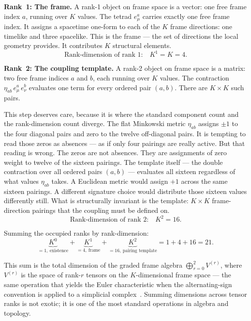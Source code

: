 \documentclass[a4paper,11pt]{article}
\begin{document}
\textbf{Rank~1: The frame.}
A rank-1 object on frame space is a vector: one free
frame index $a$, running over $K$ values. The tetrad
$e^a_\mu$ carries exactly one free frame index. It assigns
a spacetime one-form to each of the $K$ frame
directions: one timelike and three spacelike. This is
the frame --- the set of directions the local geometry
provides. It contributes $K$ structural elements.
\begin{equation*}
  \text{Rank-dimension of rank 1:}\quad K^1 = K = 4.
\end{equation*}

\textbf{Rank~2: The coupling template.}
A rank-2 object on frame space is a matrix: two free
frame indices $a$ and $b$, each running over $K$ values.
The contraction $\eta_{ab}\,e^a_\mu\,e^b_\nu$ evaluates
one term for every ordered pair $(a,b)$. There are
$K \times K$ such pairs.

This step deserves care, because it is where the standard
component count and the rank-dimension count diverge.
The flat Minkowski metric $\eta_{ab}$ assigns $\pm 1$
to the four diagonal pairs and zero to the twelve
off-diagonal pairs. It is tempting to read those zeros
as absences --- as if only four pairings are really
active. But that reading is wrong. The zeros are not
absences. They are assignments of zero weight to twelve
of the sixteen pairings. The template itself --- the
double contraction over all ordered pairs $(a,b)$ ---
evaluates all sixteen regardless of what values
$\eta_{ab}$ takes. A Euclidean metric would assign $+1$
across the same sixteen pairings. A different signature choice would distribute those sixteen
values differently still. What is structurally
invariant is the template: $K \times K$ frame-direction
pairings that the coupling must be defined on.
\begin{equation*}
  \text{Rank-dimension of rank 2:}\quad K^2 = 16.
\end{equation*}

Summing the occupied ranks by rank-dimension:
\begin{equation}
  \underbrace{K^0}_{= 1,\ \text{existence}}
  +\underbrace{K^1}_{= 4,\ \text{frame}}
  +\underbrace{K^2}_{= 16,\ \text{pairing template}}
  = 1 + 4 + 16 = 21.
  \label{eq:sum}
\end{equation}

This sum is the total dimension of the graded frame algebra
$\bigoplus_{r=0}^{2} V^{(r)}$, where $V^{(r)}$ is the
space of rank-$r$ tensors on the $K$-dimensional frame
space --- the same operation that yields the Euler
characteristic when the alternating-sign convention is
applied to a simplicial complex~\cite{Regge1961}. Summing
dimensions across tensor ranks is not exotic; it is one of
the most standard operations in algebra and topology.
\end{document}
